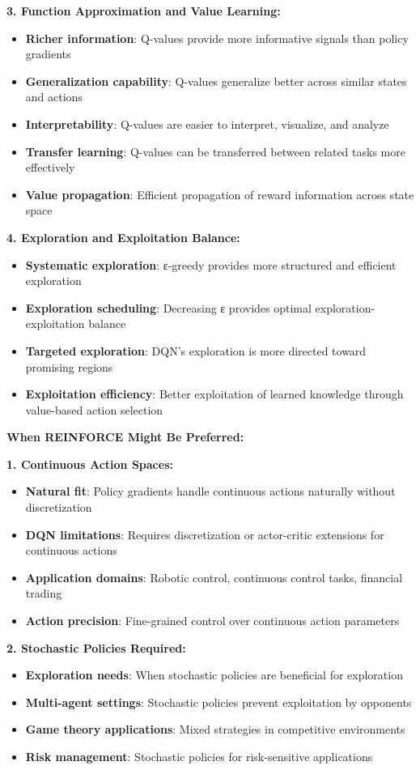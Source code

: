 \documentclass[12pt]{article}
\begin{document}
{{{\textbf{3. Function Approximation and Value Learning:}
\begin{itemize}
    \item \textbf{Richer information}: Q-values provide more informative signals than policy gradients
    \item \textbf{Generalization capability}: Q-values generalize better across similar states and actions
    \item \textbf{Interpretability}: Q-values are easier to interpret, visualize, and analyze
    \item \textbf{Transfer learning}: Q-values can be transferred between related tasks more effectively
    \item \textbf{Value propagation}: Efficient propagation of reward information across state space
\end{itemize}

\textbf{4. Exploration and Exploitation Balance:}
\begin{itemize}
    \item \textbf{Systematic exploration}: ε-greedy provides more structured and efficient exploration
    \item \textbf{Exploration scheduling}: Decreasing ε provides optimal exploration-exploitation balance
    \item \textbf{Targeted exploration}: DQN's exploration is more directed toward promising regions
    \item \textbf{Exploitation efficiency}: Better exploitation of learned knowledge through value-based action selection
\end{itemize}

\textbf{When REINFORCE Might Be Preferred:}

\textbf{1. Continuous Action Spaces:}
\begin{itemize}
    \item \textbf{Natural fit}: Policy gradients handle continuous actions naturally without discretization
    \item \textbf{DQN limitations}: Requires discretization or actor-critic extensions for continuous actions
    \item \textbf{Application domains}: Robotic control, continuous control tasks, financial trading
    \item \textbf{Action precision}: Fine-grained control over continuous action parameters
\end{itemize}

\textbf{2. Stochastic Policies Required:}
\begin{itemize}
    \item \textbf{Exploration needs}: When stochastic policies are beneficial for exploration
    \item \textbf{Multi-agent settings}: Stochastic policies prevent exploitation by opponents
    \item \textbf{Game theory applications}: Mixed strategies in competitive environments
    \item \textbf{Risk management}: Stochastic policies for risk-sensitive applications
\end{itemize}

}}}
\end{document}
